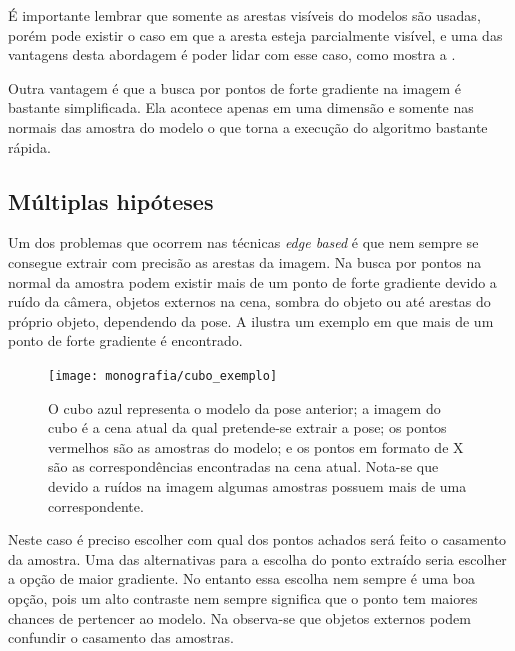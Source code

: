 É importante lembrar que somente as arestas visíveis do modelos são usadas, porém pode existir o caso em que a aresta esteja parcialmente visível, e uma das vantagens desta abordagem é poder lidar com esse caso, como mostra a .

Outra vantagem é que a busca por pontos de forte gradiente na imagem é bastante simplificada. Ela acontece apenas em uma dimensão e somente nas normais das amostra do modelo o que torna a execução do algoritmo bastante rápida.

\subsection{Múltiplas hipóteses}

Um dos problemas que ocorrem nas técnicas \emph{edge based} é que nem sempre se consegue extrair com precisão as arestas da imagem. Na busca por pontos na normal da amostra podem existir mais de um ponto de forte gradiente devido a ruído da câmera, objetos externos na cena, sombra do objeto ou até arestas do próprio objeto, dependendo da pose. A  ilustra um exemplo em que mais de um ponto de forte gradiente é encontrado.

\begin{figure}[ht!]
\centering
\texttt{[image: monografia/cubo\_exemplo]}
\caption{O cubo azul representa o modelo da pose anterior; a imagem do cubo é a cena atual da qual pretende-se extrair a pose; os pontos vermelhos são as amostras do modelo; e os pontos em formato de X são as correspondências encontradas na cena atual. Nota-se que devido a ruídos na imagem algumas amostras possuem mais de uma correspondente.}
\label{cubo_0}
\end{figure}

Neste caso é preciso escolher com qual dos pontos achados será feito o casamento da amostra. Uma das alternativas para a escolha do ponto extraído seria escolher a opção de maior gradiente. No entanto essa escolha nem sempre é uma boa opção, pois um alto contraste nem sempre significa que o ponto tem maiores chances de pertencer ao modelo. Na  observa-se que objetos externos podem confundir o casamento das amostras.

